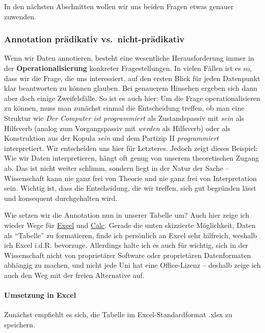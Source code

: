 \documentclass[]{article}
\let\oldparagraph\paragraph
\renewcommand{\paragraph}[1]{\oldparagraph{#1}\mbox{}}
\begin{document}
In den nächsten Abschnitten wollen wir uns beiden Fragen etwas genauer
zuwenden.

\subsubsection{Annotation prädikativ
vs.~nicht-prädikativ}\label{annotation-pradikativ-vs.nicht-pradikativ}

Wenn wir Daten annotieren, besteht eine wesentliche Herausforderung
immer in der \textbf{Operationalisierung} konkreter Fragestellungen. In
vielen Fällen ist es so, dass wir die Frage, die uns interessiert, auf
den ersten Blick für jeden Datenpunkt klar beantworten zu können
glauben. Bei genauerem Hinsehen ergeben sich dann aber doch einige
Zweifelsfälle. So ist es auch hier: Um die Frage operationalisieren zu
können, muss man zunächst einmal die Entscheidung treffen, ob man eine
Struktur wie \emph{Der Computer ist programmiert} als Zustandspassiv mit
\emph{sein} als Hilfsverb (analog zum Vorgangspassiv mit \emph{werden}
als Hilfsverb) oder als Konstruktion aus der Kopula \emph{sein} und dem
Partizip II \emph{programmiert} interpretiert. Wir entscheiden uns hier
für Letzteres. Jedoch zeigt dieses Beispiel: Wie wir Daten
interpretieren, hängt oft genug von unserem theoretischen Zugang ab. Das
ist nicht weiter schlimm, sondern liegt in der Natur der Sache --
Wissenschaft kann nie ganz frei von Theorie und nie ganz frei von
Interpretation sein. Wichtig ist, dass die Entscheidung, die wir
treffen, sich gut begründen lässt und konsequent durchgehalten wird.

Wie setzen wir die Annotation nun in unserer Tabelle um? Auch hier zeige
ich wieder Wege für \protect\hyperlink{umsetzung-in-excel}{Excel} und
\protect\hyperlink{umsetzung-in-calc}{Calc}. Gerade die unten skizzierte
Möglichkeit, Daten als \enquote{Tabelle} zu formatieren, finde ich
persönlich an Excel sehr hilfreich, weshalb ich Excel i.d.R. bevorzuge.
Allerdings halte ich es auch für wichtig, sich in der Wissenschaft nicht
von proprietärer Software oder proprietären Datenformaten abhängig zu
machen, und nicht jede Uni hat eine Office-Lizenz -- deshalb zeige ich
auch den Weg mit der freien Alternative auf.

\hypertarget{umsetzung-in-excel}{\paragraph{Umsetzung in
Excel}\label{umsetzung-in-excel}}

Zunächst empfiehlt es sich, die Tabelle im Excel-Standardformat .xlsx zu
speichern.
\end{document}
